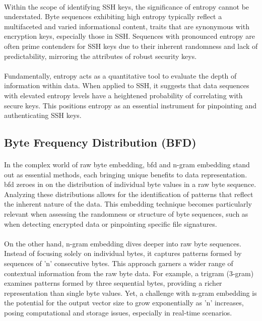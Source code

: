         \paragraph{}Within the scope of identifying SSH keys, the significance of entropy cannot be understated. Byte sequences exhibiting high entropy typically reflect a multifaceted and varied informational content, traits that are synonymous with encryption keys, especially those in SSH. Sequences with pronounced entropy are often prime contenders for SSH keys due to their inherent randomness and lack of predictability, mirroring the attributes of robust security keys.

        \paragraph{}Fundamentally, entropy acts as a quantitative tool to evaluate the depth of information within data. When applied to SSH, it suggests that data sequences with elevated entropy levels have a heightened probability of correlating with secure keys. This positions entropy as an essential instrument for pinpointing and authenticating SSH keys.
    \subsection{Byte Frequency Distribution (BFD)}
        \paragraph{}In the complex world of raw byte embedding, \acrfull{bfd} and n-gram embedding stand out as essential methods, each bringing unique benefits to data representation. \acrshort{bfd} zeroes in on the distribution of individual byte values in a raw byte sequence. Analyzing these distributions allows for the identification of patterns that reflect the inherent nature of the data. This embedding technique becomes particularly relevant when assessing the randomness or structure of byte sequences, such as when detecting encrypted data or pinpointing specific file signatures.

        \paragraph{}On the other hand, n-gram embedding dives deeper into raw byte sequences. Instead of focusing solely on individual bytes, it captures patterns formed by sequences of 'n' consecutive bytes. This approach garners a wider range of contextual information from the raw byte data. For example, a trigram (3-gram) examines patterns formed by three sequential bytes, providing a richer representation than single byte values. Yet, a challenge with n-gram embedding is the potential for the output vector size to grow exponentially as 'n' increases, posing computational and storage issues, especially in real-time scenarios.
        
